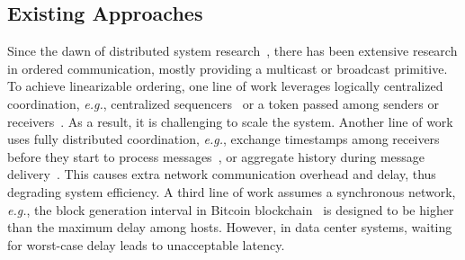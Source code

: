 \subsection{Existing Approaches}
\label{subsec:existing-approaches}

Since the dawn of distributed system research~\cite{lamport1978time}, there has been extensive research in ordered communication, mostly providing a multicast or broadcast primitive.
To achieve linearizable ordering, one line of work leverages logically centralized coordination, \textit{e.g.}, centralized sequencers~\cite{eris} or a token passed among senders or receivers~\cite{rajagopalan1989token,kim1997total,ekwall2004token}.
As a result, it is challenging to scale the system.
Another line of work uses fully distributed coordination, \textit{e.g.}, exchange timestamps among receivers before they start to process messages~\cite{lamport1978time}, or aggregate history during message delivery~\cite{chandra1996unreliable}.
This causes extra network communication overhead and delay, thus degrading system efficiency.
A third line of work assumes a synchronous network, \textit{e.g.}, the block generation interval in Bitcoin blockchain~\cite{nakamoto2008bitcoin} is designed to be higher than the maximum delay among hosts.
However, in data center systems, waiting for worst-case delay leads to unacceptable latency.

